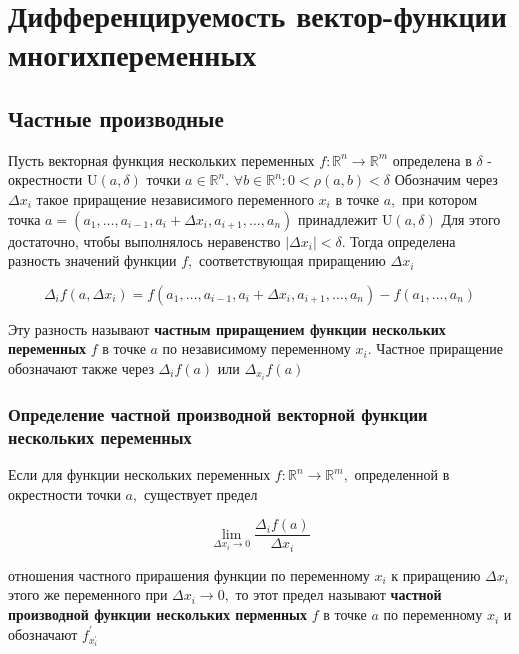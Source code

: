 \section{Дифференцируемость вектор-функции многихпеременных}
\subsection{Частные производные}

Пусть векторная функция нескольких переменных
\(f: \mathbb{R}^{n} \rightarrow \mathbb{R}^{m}\) определена в \(\delta\)
- окрестности \(\mathrm{U}(a, \delta)\) точки \(a \in \mathbb{R}^{n} .\) \(\forall b \in  \mathbb{R}^{n}: 0 < \rho(a,b) < \delta  \)
Обозначим через \(\Delta x_{i}\) такое приращение независимого
переменного \(x_{i}\) в точке \(a,\) при котором точка
\(a=\left(a_{1}, \ldots, a_{i-1}, a_{i}+\Delta x_{i}, a_{i+1}, \ldots, a_{n}\right)\)
принадлежит \(\mathrm{U}(a, \delta)\) Для этого достаточно, чтобы
выполнялось неравенство \(\left|\Delta x_{i}\right|<\delta .\) Тогда
определена разность значений функции \(f,\) соответствующая приращению
\(\Delta x_{i}\)

\[\Delta_{i} f\left(a, \Delta x_{i}\right)=f\left(a_{1}, \ldots, a_{i-1}, a_{i}+\Delta x_{i}, a_{i+1}, \ldots, a_{n}\right)-f\left(a_{1}, \ldots, a_{n}\right)\]

Эту разность называют \textbf{частным приращением функции нескольких
переменных} \(f\) в точке \(a\) по независимому переменному \(x_{i} .\)
Частное приращение обозначают также через \(\Delta_{i} f(a)\) или
\(\Delta_{x_{i}} f(a)\)

\subsubsection{Определение частной производной векторной функции нескольких переменных}

Если для функции нескольких переменных
\(f: \mathbb{R}^{n} \rightarrow \mathbb{R}^{m},\) определенной в
окрестности точки \(a,\) существует предел

\[\lim _{\Delta x_{i} \rightarrow 0} \frac{\Delta_{i} f(a)}{\Delta x_{i}}\]

отношения частного прирашения функции по переменному \(x_{i}\) к
приращению \(\Delta x_{i}\) этого же переменного при
\(\Delta x_{i} \rightarrow 0,\) то этот предел называют \textbf{частной
производной функции нескольких перменных} \(f\) в точке \(a\) по
переменному \(x_{i}\) и обозначают \(f_{x_{i}^{\prime}}^{\prime}\)

